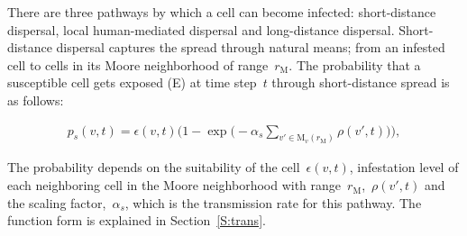 \documentclass[11pt]{article}
\newcommand{\infest}{\rho}
\newcommand{\suitable}{\epsilon}
\newcommand{\pshort}{p_s}
\newcommand{\asd}{\alpha_s}
\newcommand{\moore}{\mathrm{M}}
\newcommand{\mooreRange}{r_\mathrm{M}}
\theoremstyle{definition}
\begin{document}
There are three pathways by which a cell can become infected:
short-distance dispersal, local human-mediated dispersal and long-distance
dispersal. Short-distance dispersal captures the spread through natural
means; from an infested cell to cells in its Moore neighborhood of
range~$\mooreRange$.
The probability that a susceptible cell gets exposed (E) at time step~$t$
through short-distance spread is as follows:
\begin{linenomath}
\begin{align}\label{eqn:pshort}
    \pshort(v,t)=\suitable(v,t)\bigg(1-
    \exp\Big(-\asd\sum_{v'\in\moore_v(\mooreRange)}\infest(v',t)\Big)\bigg),
\end{align}
\end{linenomath}
The probability depends on the suitability of the cell~$\suitable(v,t)$,
infestation level of each neighboring cell in the Moore neighborhood with 
range~$\mooreRange$,~$\infest(v',t)$ and the scaling factor,~$\asd$, which is the transmission rate for this pathway. The
function form is explained in Section~\ref{S:trans}.
\end{document}
